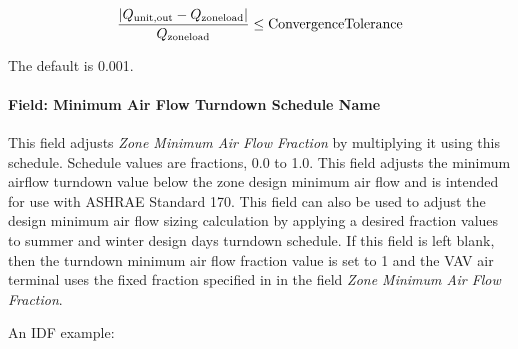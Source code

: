 \begin{equation}
  \frac{\left| Q_{\rm{unit, out}} - Q_{\rm{zone load}} \right|}{Q_{\rm{zone load}}} \le \rm{ConvergenceTolerance}
\end{equation}


The default is 0.001.

\paragraph{Field: Minimum Air Flow Turndown Schedule Name}

This field adjusts \textit{Zone Minimum Air Flow Fraction} by multiplying it using this schedule. Schedule values are fractions, 0.0 to 1.0. This field adjusts the minimum airflow turndown value below the zone design minimum air flow and is intended for use with ASHRAE Standard 170. This field can also be used to adjust the design minimum air flow sizing calculation by applying a desired fraction values to summer and winter design days turndown schedule. If this field is left blank, then the turndown minimum air flow fraction value is set to 1 and the VAV air terminal uses the fixed fraction specified in in the field \textit{Zone Minimum Air Flow Fraction}.

An IDF example:

